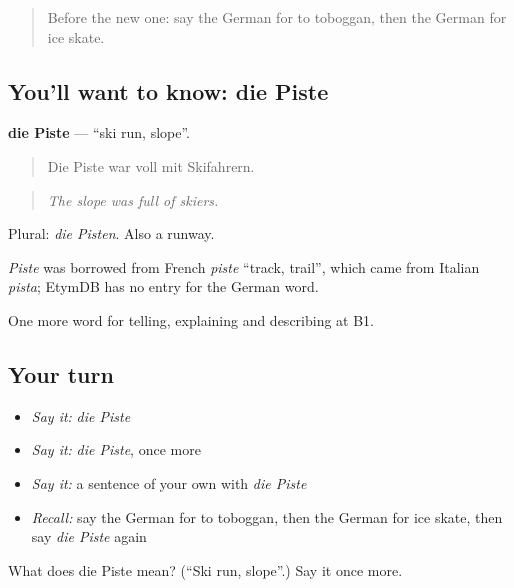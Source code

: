 \begin{quote}
Before the new one: say the German for to toboggan, then the German for ice skate.
\end{quote}

\subsection*{You'll want to know: die Piste}
\textbf{die Piste} — \textquotedblleft{}ski run, slope\textquotedblright{}.

\begin{quote}
Die Piste war voll mit Skifahrern.
\end{quote}

\begin{quote}
\emph{The slope was full of skiers.}
\end{quote}

Plural: \emph{die Pisten}. Also a runway.

\begin{cousinweb}
\emph{Piste} was borrowed from French \emph{piste} \textquotedblleft{}track, trail\textquotedblright{}, which came from Italian \emph{pista}; EtymDB has no entry for the German word.
\end{cousinweb}

\begin{grammarlens}[title={What you've built}]
One more word for telling, explaining and describing at B1.
\end{grammarlens}

\subsection*{Your turn}
\begin{itemize}
\raggedright
  \item \emph{Say it:} \emph{die Piste}
  \item \emph{Say it:} \emph{die Piste}, once more
  \item \emph{Say it:} a sentence of your own with \emph{die Piste}
  \item \emph{Recall:} say the German for to toboggan, then the German for ice skate, then say \emph{die Piste} again
\end{itemize}

\begin{tcolorbox}[breakable,colback=teal!4,colframe=teal!35!black,title={Before you move on}]
What does die Piste mean? (\textquotedblleft{}Ski run, slope\textquotedblright{}.) Say it once more.
\end{tcolorbox}
